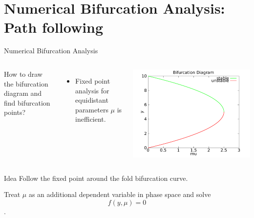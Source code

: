 \documentclass{beamer}
\begin{document}
\section{Numerical Bifurcation Analysis: Path following}
\begin{frame}{Numerical Bifurcation Analysis}
    \begin{columns}
        \begin{block}{}
            How to draw the bifurcation diagram and find bifurcation points?
        \end{block}
        \begin{itemize}
            \item Fixed point analysis for equidistant parameters $\mu$ is inefficient.
        \end{itemize}
        \includegraphics[width=\textwidth]{grafik/harvesting}
    \end{columns}
    
    \pause
    \begin{block}{Idea}
        Follow the fixed point around the fold bifurcation curve.
    \end{block}
    
    Treat $\mu$ as an additional dependent variable in phase space and solve 
    $$f(y, \mu) = 0$$. 
    
\end{frame}
\end{document}
